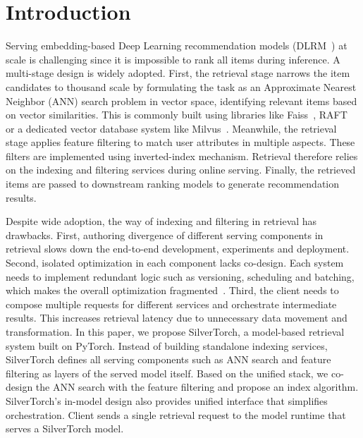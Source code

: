 \section{Introduction}
\label{sec:intro}

Serving embedding-based Deep Learning recommendation models (DLRM~\cite{mudigere2022software, covington2016deep}) at scale is challenging since it is impossible to rank all items during inference. A multi-stage design is widely adopted. First, the retrieval stage narrows the item candidates to thousand scale by formulating the task as an Approximate Nearest Neighbor (ANN) search problem in vector space, identifying relevant items based on vector similarities. This is commonly built using libraries like Faiss~\cite{douze2024faiss, johnson2019billion}, RAFT~\cite{rapidsai} or a dedicated vector database system like Milvus~\cite{wang2021milvus}. Meanwhile, the retrieval stage applies feature filtering to match user attributes in multiple aspects. These filters are implemented using inverted-index mechanism. Retrieval therefore relies on the indexing and filtering services during online serving. Finally, the retrieved items are passed to downstream ranking models to generate recommendation results.

Despite wide adoption, the way of indexing and filtering in retrieval has drawbacks. First, authoring divergence of different serving components in retrieval slows down the end-to-end development, experiments and deployment. Second, isolated optimization in each component lacks co-design. Each system needs to implement redundant logic such as versioning, scheduling and batching, which makes the overall optimization fragmented~\cite{moritz2018ray}. Third, the client needs to compose multiple requests for different services and orchestrate intermediate results. This increases retrieval latency due to unnecessary data movement and transformation.
In this paper, we propose SilverTorch, a model-based retrieval system built on PyTorch. Instead of building standalone indexing services, SilverTorch defines all serving components such as ANN search and feature filtering as layers of the served model itself. Based on the unified stack, we co-design the ANN search with the feature filtering and propose an index algorithm. SilverTorch's in-model design also provides unified interface that simplifies orchestration. Client sends a single retrieval request to the model runtime that serves a SilverTorch model.

